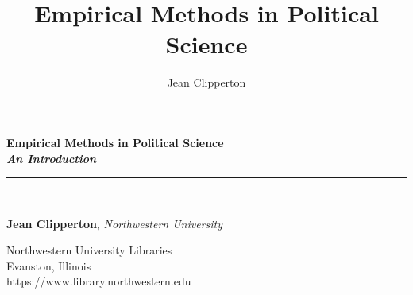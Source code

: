 \documentclass{book}
\title{Empirical Methods in Political Science}
\author{Jean Clipperton}
\begin{document}
\frontmatter

\begin{titlepage}
\begin{flushleft}

\textbf{\fontsize{48}{54}\selectfont Empirical Methods in Political
Science \\}
\textbf{\large \textit{An Introduction}}

\par\noindent\rule{\textwidth}{4pt}\\

\begin{flushright}

      \textbf{Jean Clipperton}, \emph{Northwestern University}\\
  
\end{flushright}

\vspace{\fill}

\end{flushleft}

\begin{center}
  \small{Northwestern University Libraries\\
  Evanston, Illinois\\
  https://www.library.northwestern.edu}
\end{center}
  
\end{titlepage}
\restoregeometry

\thispagestyle{empty}
\end{document}
